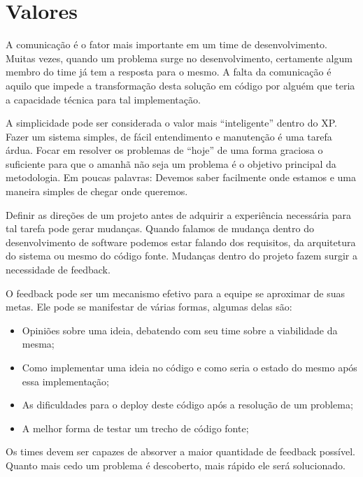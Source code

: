 \section{Valores}

A comunicação é o fator mais importante em um time de desenvolvimento. Muitas vezes, quando um problema surge no desenvolvimento, certamente algum membro do time já tem a resposta para o mesmo. A falta da comunicação é aquilo que impede a transformação desta solução em código por alguém que teria a capacidade técnica para tal implementação.

A simplicidade pode ser considerada o valor mais “inteligente” dentro do XP. Fazer um sistema simples, de fácil entendimento e manutenção é uma tarefa árdua. Focar em resolver os problemas de “hoje” de uma forma graciosa o suficiente para que o amanhã não seja um problema é o objetivo principal da metodologia. Em poucas palavras: Devemos saber facilmente onde estamos e uma maneira simples de chegar onde queremos.

Definir as direções de um projeto antes de adquirir a experiência necessária para tal tarefa pode gerar mudanças. Quando falamos de mudança dentro do desenvolvimento de software podemos estar falando dos requisitos, da arquitetura do sistema ou mesmo do código fonte. Mudanças dentro do projeto fazem surgir a necessidade de feedback.

O feedback pode ser um mecanismo efetivo para a equipe se aproximar de suas metas. Ele pode se manifestar de várias formas, algumas delas são:

\begin{itemize}

\item Opiniões sobre uma ideia, debatendo com seu time sobre a viabilidade da mesma;

\item Como implementar uma ideia no código e como seria o estado do mesmo após essa implementação;

\item As dificuldades para o deploy deste código após a resolução de um problema;

\item A melhor forma de testar um trecho de código fonte;

\end{itemize}

Os times devem ser capazes de absorver a maior quantidade de feedback possível. Quanto mais cedo um problema é descoberto, mais rápido ele será solucionado.


